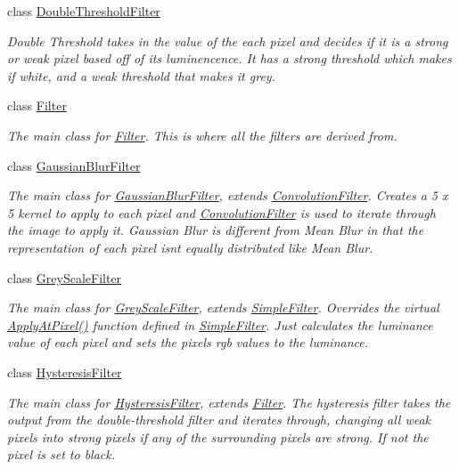 \begin{DoxyCompactItemize}
class \hyperlink{classDoubleThresholdFilter}{Double\+Threshold\+Filter}
\begin{DoxyCompactList}\small\item\em Double Threshold takes in the value of the each pixel and decides if it is a strong or weak pixel based off of its luminencence. It has a strong threshold which makes if white, and a weak threshold that makes it grey. \end{DoxyCompactList}\item 
class \hyperlink{classFilter}{Filter}
\begin{DoxyCompactList}\small\item\em The main class for \hyperlink{classFilter}{Filter}. This is where all the filters are derived from. \end{DoxyCompactList}\item 
class \hyperlink{classGaussianBlurFilter}{Gaussian\+Blur\+Filter}
\begin{DoxyCompactList}\small\item\em The main class for \hyperlink{classGaussianBlurFilter}{Gaussian\+Blur\+Filter}, extends \hyperlink{classConvolutionFilter}{Convolution\+Filter}. Creates a 5 x 5 kernel to apply to each pixel and \hyperlink{classConvolutionFilter}{Convolution\+Filter} is used to iterate through the image to apply it. Gaussian Blur is different from Mean Blur in that the representation of each pixel isn\textquotesingle{}t equally distributed like Mean Blur. \end{DoxyCompactList}\item 
class \hyperlink{classGreyScaleFilter}{Grey\+Scale\+Filter}
\begin{DoxyCompactList}\small\item\em The main class for \hyperlink{classGreyScaleFilter}{Grey\+Scale\+Filter}, extends \hyperlink{classSimpleFilter}{Simple\+Filter}. Overrides the virtual \hyperlink{classGreyScaleFilter_ac781a1ddd205f2d67d1c08481d5ab2e4}{Apply\+At\+Pixel()} function defined in \hyperlink{classSimpleFilter}{Simple\+Filter}. Just calculates the luminance value of each pixel and sets the pixels rgb values to the luminance. \end{DoxyCompactList}\item 
class \hyperlink{classHysteresisFilter}{Hysteresis\+Filter}
\begin{DoxyCompactList}\small\item\em The main class for \hyperlink{classHysteresisFilter}{Hysteresis\+Filter}, extends \hyperlink{classFilter}{Filter}. The hysteresis filter takes the output from the double-\/threshold filter and iterates through, changing all \textquotesingle{}weak\textquotesingle{} pixels into \textquotesingle{}strong\textquotesingle{} pixels if any of the surrounding pixels are \textquotesingle{}strong.\textquotesingle{} If not the pixel is set to black. \end{DoxyCompactList}\item 

\end{DoxyCompactItemize}
